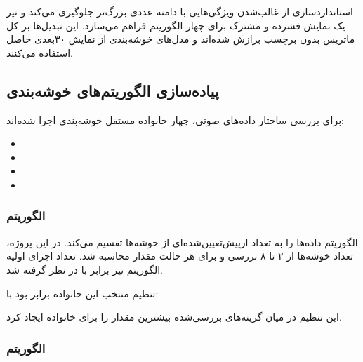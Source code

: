 \documentclass[12pt,a4paper,oneside]{report}
\begin{document}
استانداردسازی از غالب‌شدن ویژگی‌هایی با دامنه عددی بزرگ‌تر جلوگیری می‌کند
و  نیز یک نمایش فشرده و مشترک برای چهار الگوریتم فراهم می‌سازد.
این تبدیل‌ها بر کل ماتریس بدون برچسب برازش شده‌اند و مدل‌های خوشه‌بندی از
نمایش ۳۰بعدی حاصل استفاده می‌کنند.


\subsection{پیاده‌سازی الگوریتم‌های خوشه‌بندی}

برای بررسی ساختار داده‌های صوتی، چهار خانواده مستقل خوشه‌بندی اجرا شده‌اند:

\begin{itemize}

\item
{}

\item
{}

\item
{}

\item
{}

\end{itemize}


\subsubsection{الگوریتم }

الگوریتم  داده‌ها را به تعداد ازپیش‌تعیین‌شده‌ای از خوشه‌ها
تقسیم می‌کند. در این پروژه، تعداد خوشه‌ها از ۲ تا ۸ بررسی و برای هر حالت
مقدار  محاسبه شد. تعداد اجرای اولیه الگوریتم نیز برابر با
 در نظر گرفته شد.

تنظیم منتخب این خانواده برابر بود با:

\begin{center}
\end{center}

این تنظیم در میان گزینه‌های بررسی‌شده بیشترین مقدار  را
برای خانواده  ایجاد کرد.


\subsubsection{الگوریتم }
\end{document}
